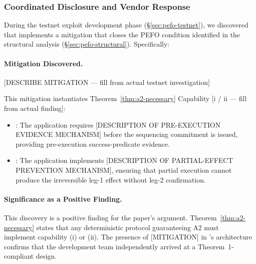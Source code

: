 
\subsubsection{Coordinated Disclosure and Vendor Response}
\label{sec:pefo-disclosure-6}

During the testnet exploit development phase (\S\ref{sec:pefo-testnet}), we
discovered that \DEPLOYEDAPP{} implements a mitigation that closes the PEFO
condition identified in the structural analysis (\S\ref{sec:pefo-structural}).
Specifically:

\paragraph{Mitigation Discovered.}
[DESCRIBE MITIGATION — fill from actual testnet investigation]

This mitigation instantiates Theorem~\ref{thm:a2-necessary} Capability
[i / ii — fill from actual finding]:

\begin{itemize}
  \item [IF CAPABILITY (i)]: The application requires [DESCRIPTION OF PRE-EXECUTION
    EVIDENCE MECHANISM] before the sequencing commitment is issued, providing
    pre-execution success-predicate evidence.
  \item [IF CAPABILITY (ii)]: The application implements [DESCRIPTION OF
    PARTIAL-EFFECT PREVENTION MECHANISM], ensuring that partial execution cannot
    produce the irreversible leg-1 effect without leg-2 confirmation.
\end{itemize}

\paragraph{Significance as a Positive Finding.}
This discovery is a positive finding for the paper's argument. Theorem~\ref{thm:a2-necessary}
states that any deterministic protocol guaranteeing A2 must implement capability (i)
or (ii). The presence of [MITIGATION] in \DEPLOYEDAPP{}'s architecture confirms that
the development team independently arrived at a Theorem~1-compliant design.

